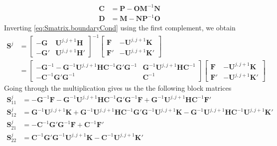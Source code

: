   \begin{align}
    \mathbf{C}	&= \mathbf{P}-\mathbf{OM}^{-1}\mathbf{N}	\\
    \mathbf{D}	&= \mathbf{M}-\mathbf{NP}^{-1}\mathbf{O}
  \end{align}
Inverting \eqref{eq:Smatrix.boundaryCond} using the first complement, we obtain
  \begin{align}
    \mathbf{S}^j 
	&= 
	  \begin{bmatrix}
	    -\mathbf{G}	& \mathbf{U}^{j,j+1}\mathbf{H}	\\
	    -\mathbf{G}'& \mathbf{U}^{j,j+1}\mathbf{H}'
	  \end{bmatrix}^{-1}
	  \begin{bmatrix}
	    \mathbf{F} 	& -\mathbf{U}^{j,j+1}\mathbf{K}	\\
	    \mathbf{F}'	& -\mathbf{U}^{j,j+1}\mathbf{K}'
	  \end{bmatrix}						\\
	&=
	 \begin{bmatrix}
	    -\mathbf{G}^{-1}-\mathbf{G}^{-1}\mathbf{U}^{j,j+1}\mathbf{HC}^{-1}\mathbf{G}'\mathbf{G}^{-1}	& \mathbf{G}^{-1}\mathbf{U}^{j,j+1}\mathbf{HC}^{-1}	\\
	    -\mathbf{C}^{-1}\mathbf{G}'\mathbf{G}^{-1}								& \mathbf{C}^{-1}
	 \end{bmatrix}
	 \begin{bmatrix}
	    \mathbf{F} 	& -\mathbf{U}^{j,j+1}\mathbf{K}	\\
	    \mathbf{F}'	& -\mathbf{U}^{j,j+1}\mathbf{K}'
	  \end{bmatrix}
  \end{align}
Going through the multiplication gives us the the following block matrices
  \begin{subequations}
  \begin{align}
    \mathbf{S}^j_{11}	&= -\mathbf{G}^{-1}\mathbf{F}-\mathbf{G}^{-1}\mathbf{U}^{j,j+1}\mathbf{HC}^{-1}\mathbf{G}'\mathbf{G}^{-1}\mathbf{F}
			    + \mathbf{G}^{-1}\mathbf{U}^{j,j+1}\mathbf{HC}^{-1}\mathbf{F}'							\\
    \mathbf{S}^j_{12}	&= \mathbf{G}^{-1}\mathbf{U}^{j,j+1}\mathbf{K}
			    +\mathbf{G}^{-1}\mathbf{U}^{j,j+1}\mathbf{HC}^{-1}\mathbf{G}'\mathbf{G}^{-1}\mathbf{U}^{j,j+1}\mathbf{K}
			    -\mathbf{G}^{-1}\mathbf{U}^{j,j+1}\mathbf{HC}^{-1}\mathbf{U}^{j,j+1}\mathbf{K}'					\\
    \mathbf{S}^j_{21}	&= -\mathbf{C}^{-1}\mathbf{G}'\mathbf{G}^{-1}\mathbf{F}+\mathbf{C}^{-1}\mathbf{F}'					\\
    \mathbf{S}^j_{22}	&=  \mathbf{C}^{-1}\mathbf{G}'\mathbf{G}^{-1}\mathbf{U}^{j,j+1}\mathbf{K} - \mathbf{C}^{-1}\mathbf{U}^{j,j+1}\mathbf{K}'
  \end{align}
  \end{subequations}
